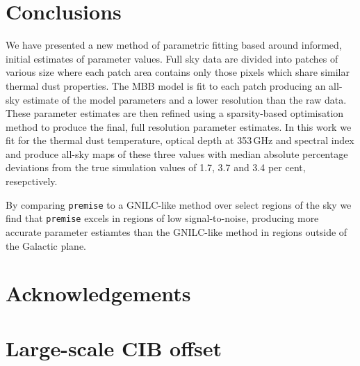 \documentclass[a4paper,fleqn,usenatbib]{mnras}
\begin{document}

\section{Conclusions}
We have presented a new method of parametric fitting based around informed, initial estimates of parameter values. Full sky data are divided into patches of various size where each patch area contains only those pixels which share similar thermal dust properties. The MBB model is fit to each patch producing an all-sky estimate of the model parameters and a lower resolution than the raw data. These parameter estimates are then refined using a sparsity-based optimisation method to produce the final, full resolution parameter estimates. In this work we fit for the thermal dust temperature, optical depth at 353\,GHz and spectral index and produce all-sky maps of these three values with median absolute percentage deviations from the true simulation values of 1.7, 3.7 and 3.4 per cent, resepctively.

By comparing {\texttt{premise}} to a GNILC-like method over select regions of the sky we find that {\texttt{premise}} excels in regions of low signal-to-noise, producing more accurate parameter estiamtes than the GNILC-like method in regions outside of the Galactic plane. 

\section*{Acknowledgements}








\appendix

\section{Large-scale CIB offset}\label{sec:apA}
\end{document}
